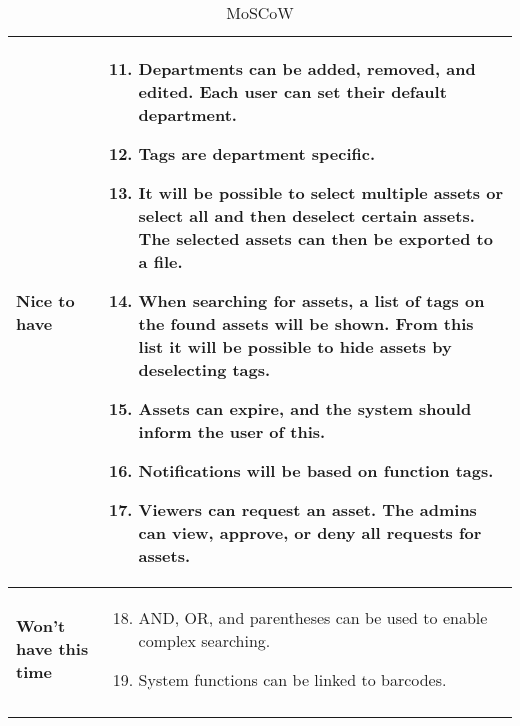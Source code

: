 \begin{longtable}{p{3.2cm} p{10cm}}
        \textbf{Nice to have} &     
        \vspace*{-7mm}
        \begin{enumerate} \setcounter{enumi}{10} \itemsep0em 
            \item Departments can be added, removed, and edited. Each user can set their default department.
            
            \item Tags are department specific.
            
            \item It will be possible to select multiple assets or select all and then deselect certain assets. The selected assets can then be exported to a file.
            
            \item When searching for assets, a list of tags on the found assets will be shown. From this list it will be possible to hide assets by deselecting tags.
            
            \item Assets can expire, and the system should inform the user of this.
            
            \item Notifications will be based on function tags.
            
            \item Viewers can request an asset. The admins can view, approve, or deny all requests for assets.
            
        \end{enumerate}
        \\
        \hline
        \textbf{Won't have this time} & 
        \vspace*{-7mm}
        \begin{enumerate} \setcounter{enumi}{17} \itemsep0em 
            \item AND, OR, and parentheses can be used to enable complex searching.
            \item System functions can be linked to barcodes.
        \end{enumerate}
        \\
        \hline
    \caption{MoSCoW}
    \label{tab:moscow}
   
\end{longtable}